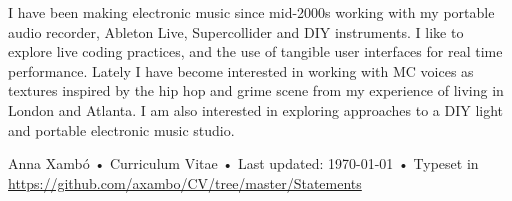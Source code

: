 \documentclass[10pt, a4paper]{article}
\begin{document}
I have been making electronic music since mid-2000s working with my portable audio recorder, Ableton Live, Supercollider and DIY instruments. I like to explore live coding practices, and the use of tangible user interfaces for real time performance. Lately I have become interested in working with MC voices as textures inspired by the hip hop and grime scene from my experience of living in London and Atlanta. I am also interested in exploring approaches to a DIY light and portable electronic music studio. 

\vfill{}

\begin{center}
{\scriptsize  Anna Xambó •\- Curriculum Vitae •\- Last updated: \today\- •\- %
Typeset in \href{http://nitens.org/taraborelli/cvtex}{
\XeTeX }\\
\href{https://github.com/axambo/CV/tree/master/Statements}{https://github.com/axambo/CV/tree/master/Statements}}
\end{center}
\end{document}
